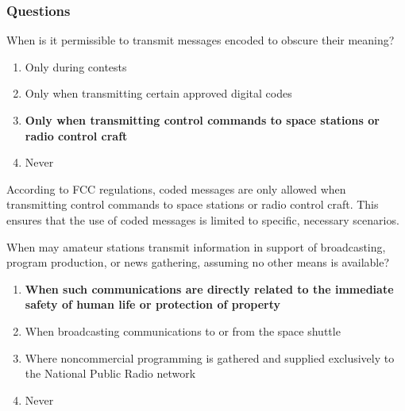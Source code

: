 
\subsubsection*{Questions}

\begin{tcolorbox}[colback=gray!10!white,colframe=black!75!black,title={T1D03}]
    When is it permissible to transmit messages encoded to obscure their meaning?
    \begin{enumerate}[label=\Alph*),noitemsep]
        \item Only during contests
        \item Only when transmitting certain approved digital codes
        \item \textbf{Only when transmitting control commands to space stations or radio control craft}
        \item Never
    \end{enumerate}
\end{tcolorbox}

According to FCC regulations, coded messages are only allowed when transmitting control commands to space stations or radio control craft. This ensures that the use of coded messages is limited to specific, necessary scenarios.

\begin{tcolorbox}[colback=gray!10!white,colframe=black!75!black,title={T1D09}]
    When may amateur stations transmit information in support of broadcasting, program production, or news gathering, assuming no other means is available?
    \begin{enumerate}[label=\Alph*),noitemsep]
        \item \textbf{When such communications are directly related to the immediate safety of human life or protection of property}
        \item When broadcasting communications to or from the space shuttle
        \item Where noncommercial programming is gathered and supplied exclusively to the National Public Radio network
        \item Never
    \end{enumerate}
\end{tcolorbox}

